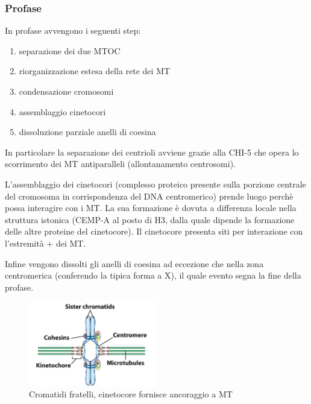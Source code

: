         \subsubsection{Profase}
            In profase avvengono i seguenti step:
            \begin{enumerate}
                \item separazione dei due MTOC
                \item riorganizzazione estesa della rete dei MT
                \item condensazione cromosomi
                \item assemblaggio cinetocori
                \item dissoluzione parziale anelli di coesina
            \end{enumerate}
            In particolare la separazione dei centrioli avviene grazie alla CHI-5 che opera lo scorrimento dei MT antiparalleli (allontanamento centrosomi).
            
            L'assemblaggio dei cinetocori (complesso proteico presente sulla porzione centrale del cromosoma in corrispondenza del DNA centromerico) prende luogo perchè possa interagire con i MT. 
            La sua formazione è dovuta a differenza locale nella struttura istonica (CEMP-A al posto di H3, dalla quale dipende la formazione delle altre proteine del cinetocore). Il cinetocore presenta siti per interazione con l’estremità + dei MT.
            
            Infine vengono dissolti gli anelli di coesina ad eccezione che nella zona centromerica (conferendo la tipica forma a X), il quale evento segna la fine della profase.
            \begin{figure}[h]
                \centering
                \includegraphics[width=0.5\textwidth]{images/cromatidi.JPG}
                \caption{\small Cromatidi fratelli, cinetocore fornisce ancoraggio a MT}
                \label{fig:mesh1}
            \end{figure}
            
